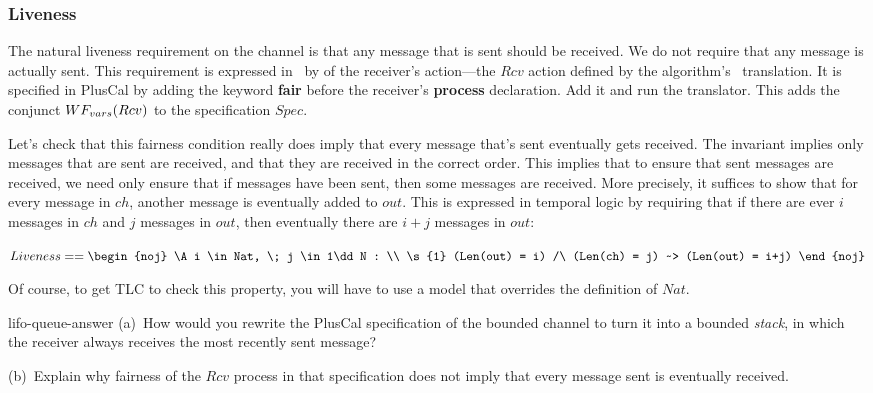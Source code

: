\documentclass[fleqn,leqno]{article}
\begin{document}
\subsubsection{Liveness} 

The natural liveness requirement on the channel is that any message
that is sent should be received.  We do not require that any message
is actually sent.  This requirement is expressed in \tlaplus\ by
  of the receiver's action---the
$Rcv$ action defined by the algorithm's \tlaplus\ translation.  It is
specified in PlusCal by adding the keyword \textbf{fair} before the
receiver's \textbf{process} declaration.  Add it and run the
translator.  This adds the conjunct $\WF_{vars}(Rcv)$ to the
specification $Spec$.

Let's check that this fairness condition really does imply that every
message that's sent eventually gets received.  The invariant implies
only messages that are sent are received, and that they are received
in the correct order.  This implies that to ensure that sent messages
are received, we need only ensure that if messages have been sent,
then some messages are received.  More precisely, it suffices to show
that for every message in $ch$, another message is eventually added to $out$.
This is expressed in temporal logic by requiring that if there are ever
$i$ messages in $ch$ and $j$ messages in $out$, then eventually there
are $i+j$ messages in $out$:
 \begin{display}
  \mbox{}%
    $Liveness == 
      \begin{noj}
      \A i \in Nat, \; j \in 1\dd N : \\ \s{1}
          (Len(out) = i) /\ (Len(ch) = j) ~> (Len(out) = i+j)
      \end{noj}
 $
 \end{display}
Of course, to get TLC to check this property, you will have to use a
model that overrides the definition of
$Nat$.
%
\begin{aquestion}{lifo-queue-answer}
(a)~How would you rewrite the PlusCal specification of the bounded
channel to turn it into a bounded \emph{stack}, in which the receiver
always receives the most recently sent message?  

(b)~Explain why fairness of the $Rcv$ process in that specification
does not imply that every message sent is eventually received.
\end{aquestion}
\end{document}
